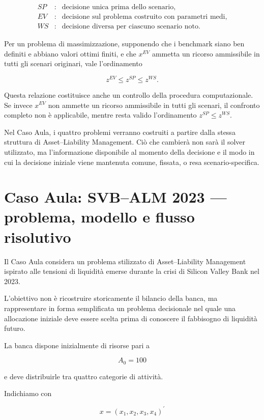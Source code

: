 \[
\begin{array}{ccl}
SP
&:&
\text{decisione unica prima dello scenario},
\\[3pt]
EV
&:&
\text{decisione sul problema costruito con parametri medi},
\\[3pt]

WS
&:&
\text{decisione diversa per ciascuno scenario noto}.
\end{array}
\]


Per un problema di massimizzazione,
supponendo che i benchmark siano
ben definiti e abbiano valori ottimi finiti,
e che $x^{EV}$ ammetta un ricorso
ammissibile in tutti gli scenari originari,
vale l'ordinamento

\[
z^{EV}
\leq
z^{SP}
\leq
z^{WS}.
\]

Questa relazione costituisce anche
un controllo della procedura computazionale.
Se invece $x^{EV}$ non ammette un ricorso
ammissibile in tutti gli scenari,
il confronto completo non \`{e} applicabile,
mentre resta valido l'ordinamento
$z^{SP}\leq z^{WS}$.


Nel Caso Aula, i quattro problemi verranno costruiti a partire dalla stessa
struttura di Asset--Liability Management. Ci\`o che cambier\`a non sar\`a il
solver utilizzato, ma l'informazione disponibile al momento della decisione e
il modo in cui la decisione iniziale viene mantenuta comune, fissata, o resa
scenario-specifica.


\section{Caso Aula: SVB--ALM 2023 --- problema, modello e flusso risolutivo}

Il Caso Aula considera un problema stilizzato di Asset--Liability Management
ispirato alle tensioni di liquidit\`a emerse durante la crisi di Silicon
Valley Bank nel 2023.

L'obiettivo non \`e ricostruire storicamente il bilancio della banca, ma
rappresentare in forma semplificata un problema decisionale nel quale una
allocazione iniziale deve essere scelta prima di conoscere il fabbisogno di
liquidit\`a futuro.

La banca dispone inizialmente di risorse pari a

\[
A_0=100
\]

\noindent e deve distribuirle tra quattro categorie di attivit\`a.

Indichiamo con

\[
x=
\left(
x_1,x_2,x_3,x_4
\right)^{\prime}
\]

